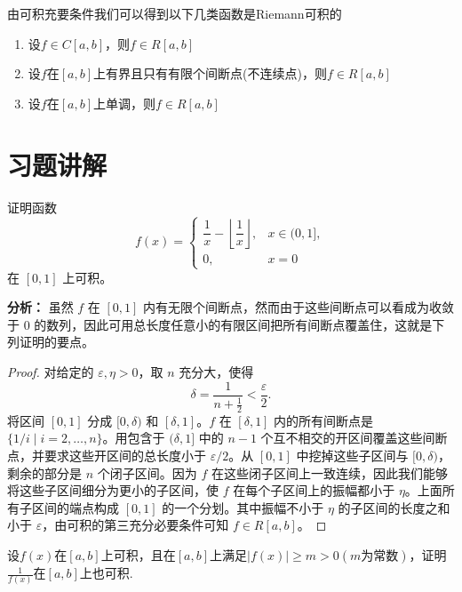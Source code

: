 \documentclass[lang=cn,12pt]{elegantbook}
\begin{document}
由可积充要条件我们可以得到以下几类函数是Riemann可积的
\begin{conclusion}
\begin{enumerate}
    \item 设$f \in C[a,b]$，则$f \in R[a,b]$
    \item 设$f$在$[a,b]$上有界且只有有限个间断点(不连续点)，则$f \in R[a,b]$
    \item 设$f $在$[a,b]$上单调，则$f \in R[a,b]$
\end{enumerate}
\end{conclusion}

\section{习题讲解}

\begin{example}
    证明函数
    \[
    f(x) = 
    \begin{cases} 
    \dfrac{1}{x} - \left\lfloor \dfrac{1}{x} \right\rfloor, & x \in (0, 1], \\ 
    0, & x = 0 
    \end{cases}
    \]
    在 \([0, 1]\) 上可积。
    \end{example}
    
    \textbf{分析：} 虽然 \( f \) 在 \([0, 1]\) 内有无限个间断点，然而由于这些间断点可以看成为收敛于 0 的数列，因此可用总长度任意小的有限区间把所有间断点覆盖住，这就是下列证明的要点。
    
    \begin{proof}
    对给定的 \(\varepsilon, \eta > 0\)，取 \( n \) 充分大，使得
    \[
    \delta = \frac{1}{n + \frac{1}{2}} < \frac{\varepsilon}{2}.
    \]
    将区间 \([0, 1]\) 分成 \([0, \delta)\) 和 \([\delta, 1]\)。\( f \) 在 \([\delta, 1]\) 内的所有间断点是 \(\{1/i \mid i = 2, \dots, n\}\)。用包含于 \((\delta, 1]\) 中的 \( n-1 \) 个互不相交的开区间覆盖这些间断点，并要求这些开区间的总长度小于 \(\varepsilon/2\)。从 \([0, 1]\) 中挖掉这些子区间与 \([0, \delta)\)，剩余的部分是 \( n \) 个闭子区间。因为 \( f \) 在这些闭子区间上一致连续，因此我们能够将这些子区间细分为更小的子区间，使 \( f \) 在每个子区间上的振幅都小于 \(\eta\)。上面所有子区间的端点构成 \([0, 1]\) 的一个分划。其中振幅不小于 \(\eta\) 的子区间的长度之和小于 \(\varepsilon\)，由可积的第三充分必要条件可知 \( f \in R[a, b] \)。
    \end{proof}

\begin{example}
    设$f(x)$在$[a,b]$上可积，且在$[a,b]$上满足$|f(x)| \geq m >0(m\text{为常数})$，证明$\frac{1}{f(x)}$在$[a,b]$上也可积.
\end{example}
\end{document}

